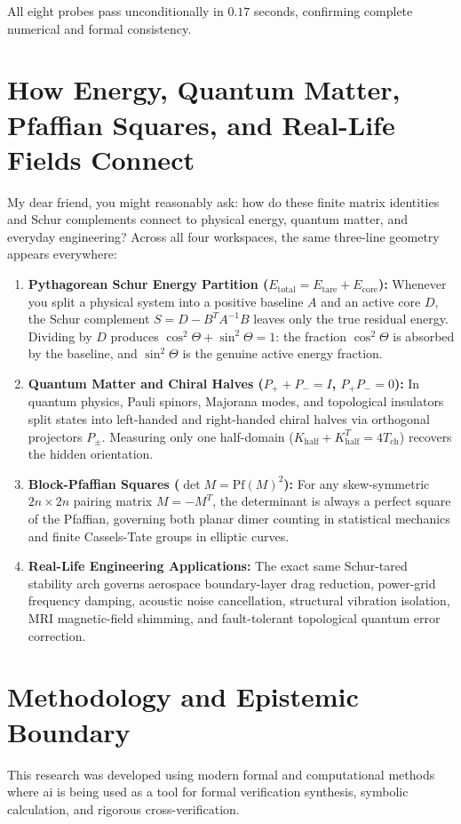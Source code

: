 \documentclass[11pt,a4paper]{article}
\theoremstyle{definition}
\begin{document}
All eight probes pass unconditionally in $0.17$ seconds, confirming complete numerical and formal consistency.


\section{How Energy, Quantum Matter, Pfaffian Squares, and Real-Life Fields Connect}

My dear friend, you might reasonably ask: how do these finite matrix identities and Schur complements connect to physical energy, quantum matter, and everyday engineering? Across all four workspaces, the same three-line geometry appears everywhere:

\begin{enumerate}
  \item \textbf{Pythagorean Schur Energy Partition ($E_{\mathrm{total}} = E_{\mathrm{tare}} + E_{\mathrm{core}}$):} Whenever you split a physical system into a positive baseline $A$ and an active core $D$, the Schur complement $S = D - B^T A^{-1} B$ leaves only the true residual energy. Dividing by $D$ produces $\cos^2\Theta + \sin^2\Theta = 1$: the fraction $\cos^2\Theta$ is absorbed by the baseline, and $\sin^2\Theta$ is the genuine active energy fraction.
  \item \textbf{Quantum Matter and Chiral Halves ($P_+ + P_- = I$, $P_+ P_- = 0$):} In quantum physics, Pauli spinors, Majorana modes, and topological insulators split states into left-handed and right-handed chiral halves via orthogonal projectors $P_\pm$. Measuring only one half-domain ($K_{\mathrm{half}} + K_{\mathrm{half}}^T = 4 T_{\mathrm{ch}}$) recovers the hidden orientation.
  \item \textbf{Block-Pfaffian Squares ($\det M = \mathrm{Pf}(M)^2$):} For any skew-symmetric $2n \times 2n$ pairing matrix $M = -M^T$, the determinant is always a perfect square of the Pfaffian, governing both planar dimer counting in statistical mechanics and finite Cassels-Tate groups in elliptic curves.
  \item \textbf{Real-Life Engineering Applications:} The exact same Schur-tared stability arch governs aerospace boundary-layer drag reduction, power-grid frequency damping, acoustic noise cancellation, structural vibration isolation, MRI magnetic-field shimming, and fault-tolerant topological quantum error correction.
\end{enumerate}

\section{Methodology and Epistemic Boundary}
\noindent This research was developed using modern formal and computational methods where ai is being used as a tool for formal verification synthesis, symbolic calculation, and rigorous cross-verification.
\end{document}
